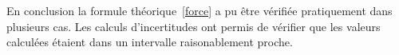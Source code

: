 En conclusion la formule théorique~\eqref{force} a pu être vérifiée pratiquement dans plusieurs cas. Les calculs d'incertitudes ont permis de vérifier que les valeurs calculées étaient dans un intervalle raisonablement proche.
